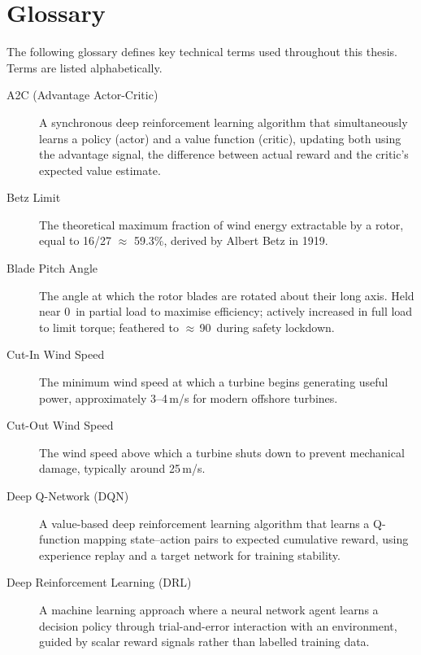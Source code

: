 \chapter{Glossary}
\label{app:glossary}

The following glossary defines key technical terms used throughout this thesis. Terms
are listed alphabetically.

\begin{description}
  \item[A2C (Advantage Actor-Critic)] A synchronous deep reinforcement learning algorithm
    that simultaneously learns a policy (actor) and a value function (critic), updating
    both using the advantage signal, the difference between actual reward and the critic's
    expected value estimate.

  \item[Betz Limit] The theoretical maximum fraction of wind energy extractable by a
    rotor, equal to 16/27 $\approx$ 59.3\%, derived by Albert Betz in 1919.

  \item[Blade Pitch Angle] The angle at which the rotor blades are rotated about their
    long axis. Held near 0\textdegree\ in partial load to maximise efficiency; actively
    increased in full load to limit torque; feathered to $\approx$\,90\textdegree\ during
    safety lockdown.

  \item[Cut-In Wind Speed] The minimum wind speed at which a turbine begins generating
    useful power, approximately 3--4\,m/s for modern offshore turbines.

  \item[Cut-Out Wind Speed] The wind speed above which a turbine shuts down to prevent
    mechanical damage, typically around 25\,m/s.

  \item[Deep Q-Network (DQN)] A value-based deep reinforcement learning algorithm that
    learns a Q-function mapping state--action pairs to expected cumulative reward, using
    experience replay and a target network for training stability.

  \item[Deep Reinforcement Learning (DRL)] A machine learning approach where a neural
    network agent learns a decision policy through trial-and-error interaction with an
    environment, guided by scalar reward signals rather than labelled training data.


\end{description}
